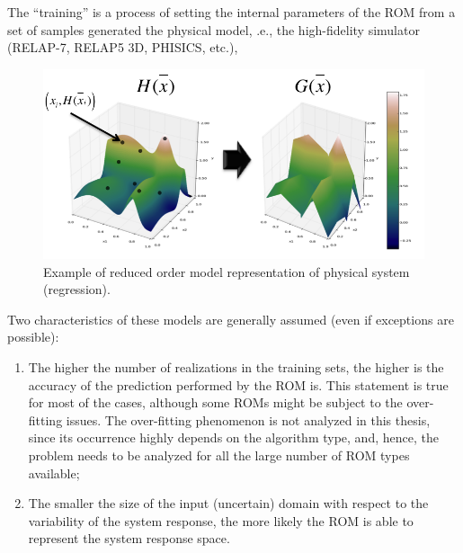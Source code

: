 The ``training'' is a process of setting the internal parameters of the ROM from a set
of samples generated the physical model, .e.,  
 the high-fidelity simulator (RELAP-7, RELAP5 
3D, PHISICS, etc.),
\begin{figure}[h!]
  \centering
  \includegraphics[width=1.0\textwidth]  {pics/ROMexampleOfPhysicalSystem.png}
  \caption{Example of reduced order model representation of physical system (regression).}
  \label{fig:ROMexampleOfPhysicalSystem}
\end{figure}

Two characteristics of these models 
are generally assumed (even if exceptions are possible):
\begin{enumerate}
  \item The higher the number of realizations in the training sets, the 
higher is the accuracy of the prediction performed by the ROM is. This 
statement is true for most of the cases, although some ROMs might be 
subject to the over-fitting issues. The over-fitting phenomenon is not 
analyzed in this thesis, since its occurrence highly depends on the 
algorithm type, and, hence, the problem needs to be analyzed for all 
the large number of ROM types available;
  \item The smaller the size of the input (uncertain) domain with 
  respect to the variability of the system response, the more likely the 
  ROM is able to represent the system response space.
\end{enumerate}

